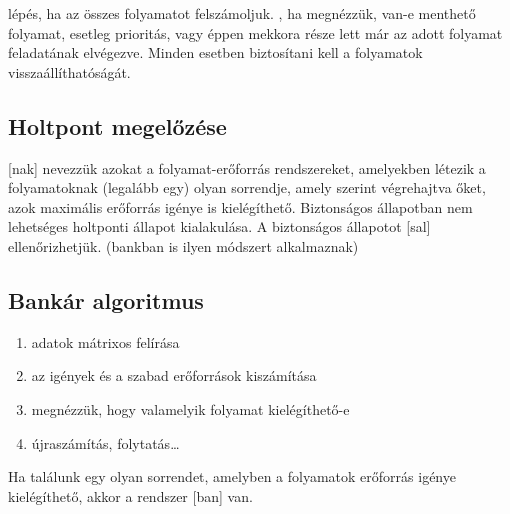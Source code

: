 \documentclass[../main.tex]{subfiles}
\begin{document}
 lépés, ha az összes folyamatot felszámoljuk.
, ha megnézzük, van-e menthető folyamat, esetleg
prioritás, vagy éppen mekkora része lett már az adott
folyamat feladatának elvégezve. Minden esetben biztosítani
kell a folyamatok visszaállíthatóságát.

\subsection{Holtpont megelőzése}

[nak] nevezzük azokat a folyamat-erőforrás rendszereket,
amelyekben létezik a folyamatoknak (legalább egy) olyan sorrendje,
amely szerint végrehajtva őket, azok maximális erőforrás igénye is kielégíthető.
Biztonságos állapotban nem lehetséges holtponti állapot kialakulása.
A biztonságos állapotot [sal] ellenőrizhetjük.
(bankban is ilyen módszert alkalmaznak)

\subsection{Bankár algoritmus}

\begin{enumerate}
  \item adatok mátrixos felírása
  \item az igények és a szabad erőforrások kiszámítása
  \item megnézzük, hogy valamelyik folyamat kielégíthető-e
  \item újraszámítás, folytatás\dots
\end{enumerate}
Ha találunk egy olyan sorrendet,
amelyben a folyamatok erőforrás igénye kielégíthető,
akkor a rendszer [ban] van.
\end{document}
